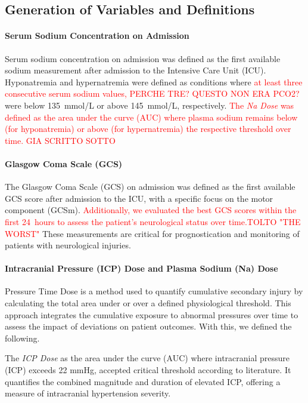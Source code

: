 \subsection{Generation of Variables and Definitions}

\paragraph{Serum Sodium Concentration on Admission}

Serum sodium concentration on admission was defined as the first available sodium measurement after admission to the Intensive Care Unit (ICU). Hyponatremia and hypernatremia were defined as conditions where \textcolor{red}{at least three consecutive serum sodium values, PERCHE TRE? QUESTO NON ERA PCO2?} were below 135~mmol/L or above 145~mmol/L, respectively. 
\textcolor{red}{The \textit{Na Dose} was defined as the area under the curve (AUC) where plasma sodium remains below (for hyponatremia) or above (for hypernatremia) the respective threshold over time. GIA SCRITTO SOTTO}

\paragraph{Glasgow Coma Scale (GCS)}

The Glasgow Coma Scale (GCS) on admission was defined as the first available GCS score after admission to the ICU, with a specific focus on the motor component (GCSm)\cite{kouloulasPrognosticValueTimerelated2013}. \textcolor{red}{Additionally, we evaluated the best GCS scores within the first 24~hours to assess the patient's neurological status over time.TOLTO "THE WORST"} These measurements are critical for prognostication and monitoring of patients with neurological injuries.

\paragraph{Intracranial Pressure (ICP) Dose and Plasma Sodium (Na) Dose}
Pressure Time Dose is a method used to quantify cumulative secondary injury by calculating the total area under or over a defined physiological threshold. This approach integrates the cumulative exposure to abnormal pressures over time to assess the impact of deviations on patient outcomes. With this, we defined the following.

The \textit{ICP Dose} as the area under the curve (AUC) where intracranial pressure (ICP) exceeds 22 mmHg, accepted critical threshold according to literature\cite{hawrylukManagementAlgorithmPatients2019a}. It quantifies the combined magnitude and duration of elevated ICP, offering a measure of intracranial hypertension severity.

